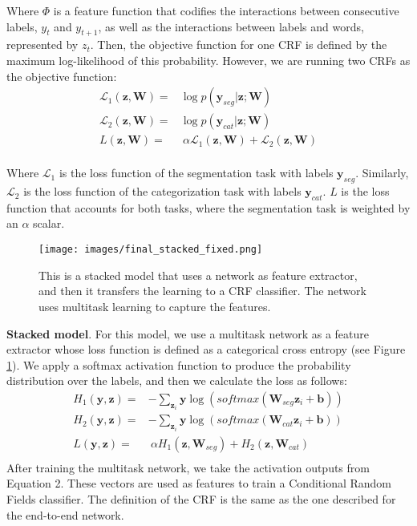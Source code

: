 \documentclass[11pt,a4paper]{article}
\begin{document}
Where $\Phi$  is a feature function that codifies the interactions between consecutive labels, $y_t$ and $y_{t+1}$, as well as the interactions between labels and words, represented by $z_t$. Then, the objective function for one CRF is defined by the maximum log-likelihood of this probability. However, we are running two CRFs as the objective function:
\begin{equation*} \label{eq:lstm_cell}
\begin{split}
\mathcal{L}_1(\mathbf{z}, \mathbf{W}) = &\log p(\mathbf{y}_{seg}| \mathbf{z}; \mathbf{W}) \\
\mathcal{L}_2(\mathbf{z}, \mathbf{W}) = &\log p(\mathbf{y}_{cat}| \mathbf{z}; \mathbf{W}) \\
L(\mathbf{z}, \mathbf{W}) = &~\alpha \mathcal{L}_1(\mathbf{z}, \mathbf{W}) + \mathcal{L}_2(\mathbf{z}, \mathbf{W}) \\
\end{split}
\end{equation*}

Where $\mathcal{L}_1$ is the loss function of the segmentation task with labels $\mathbf{y}_{seg}$. Similarly, $\mathcal{L}_2$ is the loss function of the categorization task with labels $\mathbf{y}_{cat}$. $L$ is the loss function that accounts for both tasks, where the segmentation task is weighted by an $\alpha$ scalar.

\begin{figure}
\centering
\texttt{[image: images/final\_stacked\_fixed.png]}
\caption{ This is a stacked model that uses a network as feature extractor, and then it transfers the learning to a CRF classifier. The network uses multitask learning to capture the features. }
\label{f:system2}
\end{figure}

\noindent\textbf{Stacked model}. For this model, we use a multitask network as a feature extractor whose loss function is defined as a categorical cross entropy (see Figure \ref{f:system2}). We apply a softmax activation function to produce the probability distribution over the labels, and then we calculate the loss as follows:
\begin{equation*} \label{eq:xentropy}
\begin{split}
H_1(\mathbf{y}, \mathbf{z}) = & -\sum_{\mathbf{z}_i} \mathbf{y} \log(softmax(\mathbf{W}_{seg} \mathbf{z}_i + \mathbf{b})) \\
H_2(\mathbf{y}, \mathbf{z}) = & -\sum_{\mathbf{z}_i} \mathbf{y} \log(softmax(\mathbf{W}_{cat} \mathbf{z}_i + \mathbf{b})) \\
L(\mathbf{y}, \mathbf{z}) = & ~\alpha H_1(\mathbf{z}, \mathbf{W}_{seg}) + H_2(\mathbf{z}, \mathbf{W}_{cat}) \\
\end{split}
\end{equation*}
After training the multitask network, we take the activation outputs from Equation 2. These vectors are used as features to train a Conditional Random Fields classifier. The definition of the CRF is the same as the one described for the end-to-end network.
\end{document}
